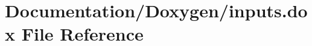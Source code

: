 \hypertarget{inputs_8dox}{}\section{Documentation/\+Doxygen/inputs.dox File Reference}
\label{inputs_8dox}
